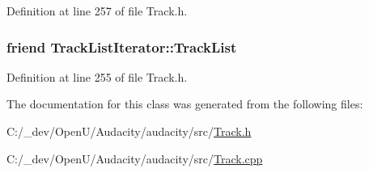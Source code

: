 Definition at line 257 of file Track.\+h.

\subsubsection[{\texorpdfstring{Track\+List}{TrackList}}]{\setlength{\rightskip}{0pt plus 5cm}friend Track\+List\+Iterator\+::\+Track\+List\hspace{0.3cm}{\ttfamily [protected]}}\hypertarget{class_track_list_iterator_a57f1a96eb694556d450063321859fd51}{}\label{class_track_list_iterator_a57f1a96eb694556d450063321859fd51}


Definition at line 255 of file Track.\+h.



The documentation for this class was generated from the following files\+:\begin{DoxyCompactItemize}
\item 
C\+:/\+\_\+dev/\+Open\+U/\+Audacity/audacity/src/\hyperlink{src_2track_8h}{Track.\+h}\item 
C\+:/\+\_\+dev/\+Open\+U/\+Audacity/audacity/src/\hyperlink{src_2track_8cpp}{Track.\+cpp}\end{DoxyCompactItemize}
